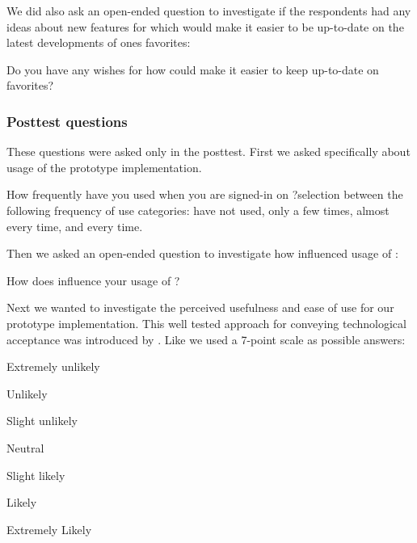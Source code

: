 We did also ask an open-ended question to investigate if the respondents had
any ideas about new features for \urort{} which would make it easier to
be up-to-date on the latest developments of ones favorites:

\begin{items}
  \item Do you have any wishes for how \urort{} could make it easier to
    keep up-to-date on favorites?
\end{items}

\subsubsection{Posttest questions}

These questions were asked only in the posttest. First we asked specifically
about usage of the prototype implementation.

\begin{items}
  \item How frequently have you used \latest{} when you are
    signed-in on \urort{}?\dash{}selection between the following
    frequency of use categories: have not used, only a few times, almost
    every time, and every time.
\end{items}

Then we asked an open-ended question to investigate how \latest{} influenced
usage of \urort{}:

\begin{items}
  \item How does \latest{} influence your usage of \urort{}?
\end{items}

Next we wanted to investigate the perceived usefulness and ease of use for
our prototype implementation. This well tested approach for conveying
technological acceptance was introduced by \citet{davis89}.
Like \citet[]{davis89} we used a 7-point scale as possible answers:

\begin{items}
  \item Extremely unlikely
  \item Unlikely
  \item Slight unlikely
  \item Neutral
  \item Slight likely
  \item Likely
  \item Extremely Likely
\end{items}

